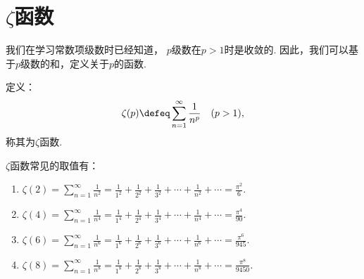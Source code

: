 \section{\texorpdfstring{\(\zeta\)}{\textzeta}函数}
我们在学习常数项级数时已经知道，
\(p\)级数在\(p>1\)时是收敛的.
因此，我们可以基于\(p\)级数的和，定义关于\(p\)的函数.
\begin{definition}
定义：\begin{equation*}
	\zeta(p)
	\defeq
	\sum_{n=1}^\infty \frac{1}{n^p}
	\quad(p>1),
\end{equation*}
称其为\(\zeta\)函数.
\end{definition}

\begin{proposition}
\def\zetafunc#1{\zeta(#1)%
	= \sum_{n=1}^\infty \frac{1}{n^{#1}}%
	= \frac{1}{1^{#1}}%
		+\frac{1}{2^{#1}}%
		+\frac{1}{3^{#1}}%
		+\dotsb%
		+\frac{1}{n^{#1}}%
		+\dotsb}%
\(\zeta\)函数常见的取值有：\begin{enumerate}
	\item \(\zetafunc{2} = \frac{\pi^2}{6}\).
	\item \(\zetafunc{4} = \frac{\pi^4}{90}\).
	\item \(\zetafunc{6} = \frac{\pi^6}{945}\).
	\item \(\zetafunc{8} = \frac{\pi^8}{9450}\).
\end{enumerate}
\end{proposition}

